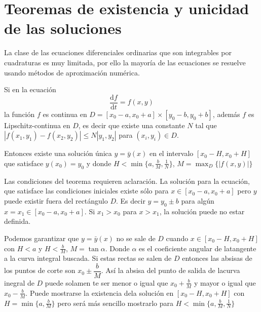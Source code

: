 \section{Teoremas de existencia y unicidad de las soluciones}

La clase de las ecuaciones diferenciales ordinarias que son integrables por cuadraturas es muy limitada, por ello la mayor\'ia de las ecuaciones se resuelve usando m\'etodos de aproximaci\'on num\'erica.


\begin{teorema}
Si en la ecuaci\'on
$$
\dfrac{\mathrm{d}f}{\mathrm{d}t}=f(x,y)
$$
la funci\'on
$f$ es continua en $D=\left[x_0-a,x_0+a\right]\times\left[y_0-b,y_0+b\right]$, adem\'as $f$ es Lipschitz-continua en $D$, es decir que existe una constante $N$ tal que $|f(x_1,y_1)-f(x_2,y_2)|\leq N|y_1,y_2|$ para $(x_i,y_i)\in D$.

Entonces existe una soluci\'on \'unica $y=\bar{y}(x)$ en el intervalo $\left[x_0-H,x_0+H\right]$ que satisface $y(x_0)=y_0$ y donde $H<\min\{a,\frac{b}{M},\frac{1}{N}\}$, $M=\max_{D}\{|f(x,y)|\} $
\end{teorema}


Las condiciones del teorema  requieren aclaraci\'on. La soluci\'on para la ecuaci\'on, que satisface las condiciones iniciales  existe s\'olo para $x\in [x_0-a,x_0+a]$ pero $y$ puede existir fuera del rect\'angulo $D$. Es decir $y=y_0\pm b$ para alg\'un $x=x_1\in[x_0-a,x_0+a]$. Si $x_1>x_0$ para $x>x_1$, la soluci\'on puede no estar definida.

Podemos garantizar que $y=\bar{y}(x)$ no se sale de $D$ cuando $x\in[x_0-H,x_0+H]$ con $H<a$ y $H<\frac{b}{M}$, $M=\tan\alpha$. Donde $\alpha$ es el coeficiente angular de latangente a la curva integral buscada. Si estas rectas se salen de $D$ entonces las absisas de los puntos de corte son $x_0\pm\dfrac{b}{M}$. As\'i la absisa  del punto de salida de lacurva inegral de $D$ puede solamen
te ser menor o igual que $x_0+\frac{b}{M}$ y mayor o igual que $x_0-\frac{b}{M}$. Puede mostrarse la existencia  dela soluci\'on en $[x_0-H,x_0+H]$ con $H=\min\{a,\frac{b}{M}\}$ pero ser\'a m\'as sencillo mostrarlo para $H<\min\{a,\frac{b}{M},\frac{1}{N}\}$

\begin{figure}[H]
\centering
{}
    \caption{}
    \label{fig:my_label}
\end{figure}

